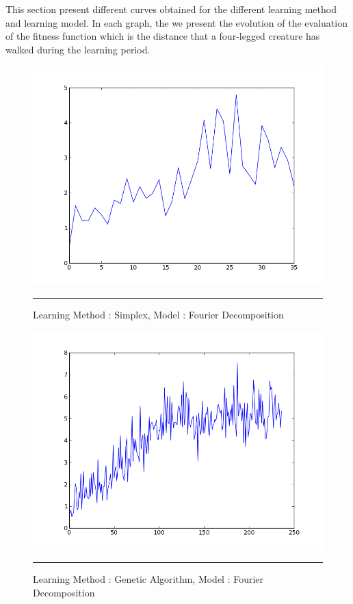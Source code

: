 This section present different curves obtained for the different learning method and learning model. In each graph, the we present the evolution of the evaluation of the fitness function which is the distance that a four-legged creature has walked during the learning period.


\begin{figure}[htbp]
    \centering
    \includegraphics[scale=0.5]{Figures/simplex_fourier.png}
    \rule{35em}{0.5pt}
    \caption[Learning Method : Simplex, Model : Fourier Decomposition]{Learning Method : Simplex, Model : Fourier Decomposition}
    \label{fig:simplex_fourier}
\end{figure}


\begin{figure}[htbp]
    \centering
    \includegraphics[scale=0.5]{Figures/gen_fourier.png}
    \rule{35em}{0.5pt}
    \caption[Learning Method : GA, Model : Fourier Decomposition]{Learning Method : Genetic Algorithm, Model : Fourier Decomposition}
    \label{fig:simplex_fourier}
\end{figure}

